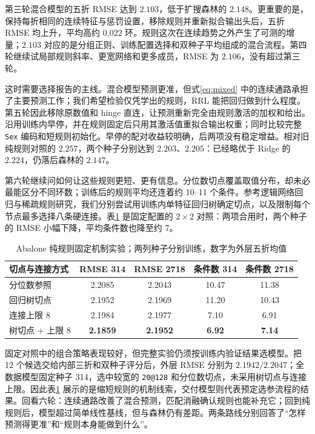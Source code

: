 \documentclass[UTF8,a4paper,11pt]{ctexart}
\begin{document}
第三轮混合模型的五折 RMSE 达到 $2.103$，低于扩搜森林的 $2.148$。更重要的是，保持每折相同的连续特征与惩罚设置，移除规则并重新拟合输出头后，五折 RMSE 均上升，平均高约 $0.022$ 环。规则这次在连续趋势之外产生了可测的增量；$2.103$ 对应的是分组正则、训练配置选择和双种子平均组成的混合流程。第四轮继续试局部规则斜率、更宽网络和更多成员，RMSE 为 $2.106$，没有超过第三轮。

这时需要选择报告的主线。混合模型预测更准，但式\eqref{eq:mixed} 中的连续通路承担了主要预测工作；我们希望检验仅凭学出的规则，RRL 能把回归做到什么程度。第五轮因此移除原数值和 hinge 直连，让预测重新完全由规则激活的加权和给出。沿用训练内早停，并在规则固定后只用其激活值重拟合输出权重；同时比较完整 \texttt{Sex} 编码和短规则初始化。早停的配对收益较明确，后两项没有稳定增益。相对旧纯规则对照的 $2.257$，两个种子分别达到 $2.203$、$2.205$：已经略优于 Ridge 的 $2.224$，仍落后森林的 $2.147$。

第六轮继续问如何让这些规则更短、更有信息。分位数切点覆盖取值分布，却未必最能区分不同环数；训练后的规则平均还连着约 10--11 个条件。参考逻辑网络回归与稀疏规则研究\cite{dln,ttsparse}，我们分别尝试用训练内单特征回归树确定切点，以及限制每个节点最多选择八条硬连接。表\ref{tab:factorial} 是固定配置的 $2\times2$ 对照：两项合用时，两个种子的 RMSE 小幅下降，平均条件数也降至约 7。

\begin{table}[!htbp]
\centering\small
\caption{Abalone 纯规则固定机制实验；两列种子分别训练，数字为外层五折均值}
\label{tab:factorial}
\begin{tabular}{@{}lcccc@{}}
\toprule
切点与连接方式 & RMSE 314 & RMSE 2718 & 条件数 314 & 条件数 2718\\
\midrule
分位数参照 & 2.2085 & 2.2043 & 10.47 & 11.38\\
回归树切点 & 2.1952 & 2.1969 & 11.20 & 10.43\\
连接上限 8 & 2.1984 & 2.1977 & 7.10 & 6.91\\
树切点 + 上限 8 & \textbf{2.1859} & \textbf{2.1952} & \textbf{6.92} & \textbf{7.14}\\
\bottomrule
\end{tabular}
\end{table}

固定对照中的组合策略表现较好，但完整实验仍须按训练内验证结果选模型。把 12 个候选交给内部三折和双种子评分后，外层 RMSE 分别为 $2.1942/2.2047$；全数据模型固定种子 314，选中较宽的 \texttt{20@128} 和分位数切点，未采用树切点与连接上限。因此表\ref{tab:factorial} 展示的是缩短规则的机制线索，交付模型则代表预定选参流程的结果。回看六轮：连续通路改善了混合预测，匹配消融确认规则也能补充它；回到纯规则后，模型超过简单线性基线，但与森林仍有差距。两条路线分别回答了“怎样预测得更准”和“规则本身能做到什么”。
\end{document}
